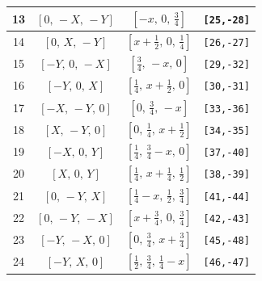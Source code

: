 \documentclass[fleqn,8pt]{jsarticle}
\begin{document}
\begin{longtable}{cccc}
13 & $\left[ 0,\, - X,\, - Y \right]$ & $\left[ - x,\, 0,\, \frac{3}{4} \right]$ & {\tt [25,-28]} \\ \hline
14 & $\left[ 0,\, X,\, - Y \right]$ & $\left[ x + \frac{1}{2},\, 0,\, \frac{1}{4} \right]$ & {\tt [26,-27]} \\ \hline
15 & $\left[ - Y,\, 0,\, - X \right]$ & $\left[ \frac{3}{4},\, - x,\, 0 \right]$ & {\tt [29,-32]} \\ \hline
16 & $\left[ - Y,\, 0,\, X \right]$ & $\left[ \frac{1}{4},\, x + \frac{1}{2},\, 0 \right]$ & {\tt [30,-31]} \\ \hline
17 & $\left[ - X,\, - Y,\, 0 \right]$ & $\left[ 0,\, \frac{3}{4},\, - x \right]$ & {\tt [33,-36]} \\ \hline
18 & $\left[ X,\, - Y,\, 0 \right]$ & $\left[ 0,\, \frac{1}{4},\, x + \frac{1}{2} \right]$ & {\tt [34,-35]} \\ \hline
19 & $\left[ - X,\, 0,\, Y \right]$ & $\left[ \frac{1}{4},\, \frac{3}{4} - x,\, 0 \right]$ & {\tt [37,-40]} \\ \hline
20 & $\left[ X,\, 0,\, Y \right]$ & $\left[ \frac{1}{4},\, x + \frac{1}{4},\, \frac{1}{2} \right]$ & {\tt [38,-39]} \\ \hline
21 & $\left[ 0,\, - Y,\, X \right]$ & $\left[ \frac{1}{4} - x,\, \frac{1}{2},\, \frac{3}{4} \right]$ & {\tt [41,-44]} \\ \hline
22 & $\left[ 0,\, - Y,\, - X \right]$ & $\left[ x + \frac{3}{4},\, 0,\, \frac{3}{4} \right]$ & {\tt [42,-43]} \\ \hline
23 & $\left[ - Y,\, - X,\, 0 \right]$ & $\left[ 0,\, \frac{3}{4},\, x + \frac{3}{4} \right]$ & {\tt [45,-48]} \\ \hline
24 & $\left[ - Y,\, X,\, 0 \right]$ & $\left[ \frac{1}{2},\, \frac{3}{4},\, \frac{1}{4} - x \right]$ & {\tt [46,-47]} \\
\end{longtable}
\renewcommand{\arraystretch}{1.2}
\end{document}
